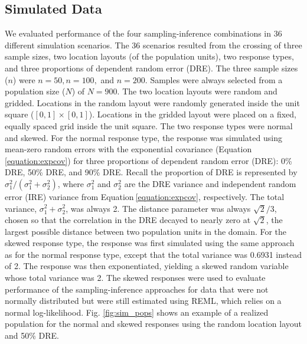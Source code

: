 \documentclass[]{elsarticle} %
\begin{document}
\hypertarget{sec:mm_sim}{%
\subsection{Simulated Data}\label{sec:mm_sim}}

We evaluated performance of the four sampling-inference combinations in
36 different simulation scenarios. The 36 scenarios resulted from the
crossing of three sample sizes, two location layouts (of the population
units), two response types, and three proportions of dependent random
error (DRE). The three sample sizes (\(n\)) were \(n = 50, n = 100,\)
and \(n = 200\). Samples were always selected from a population size
(\(N\)) of \(N = 900\). The two location layouts were random and
gridded. Locations in the random layout were randomly generated inside
the unit square (\([0, 1] \times [0, 1]\)). Locations in the gridded
layout were placed on a fixed, equally spaced grid inside the unit
square. The two response types were normal and skewed. For the normal
response type, the response was simulated using mean-zero random errors
with the exponential covariance (Equation\(~\)\ref{equation:expcov}) for
three proportions of dependent random error (DRE): 0\% DRE, 50\% DRE,
and 90\% DRE. Recall the proportion of DRE is represented by
\(\sigma^2_1 / (\sigma^2_1 + \sigma^2_2)\), where \(\sigma^2_1\) and
\(\sigma^2_2\) are the DRE variance and independent random error (IRE)
variance from Equation\(~\)\ref{equation:expcov}, respectively. The
total variance, \(\sigma^2_1 + \sigma^2_2\), was always 2. The distance
parameter was always \(\sqrt{2} / 3\), chosen so that the correlation in
the DRE decayed to nearly zero at \(\sqrt{2}\), the largest possible
distance between two population units in the domain. For the skewed
response type, the response was first simulated using the same approach
as for the normal response type, except that the total variance was
0.6931 instead of 2. The response was then exponentiated, yielding a
skewed random variable whose total variance was 2. The skewed responses
were used to evaluate performance of the sampling-inference approaches
for data that were not normally distributed but were still estimated
using REML, which relies on a normal log-likelihood. Fig.
\ref{fig:sim_pops} shows an example of a realized population for the
normal and skewed responses using the random location layout and 50\%
DRE.
\end{document}
